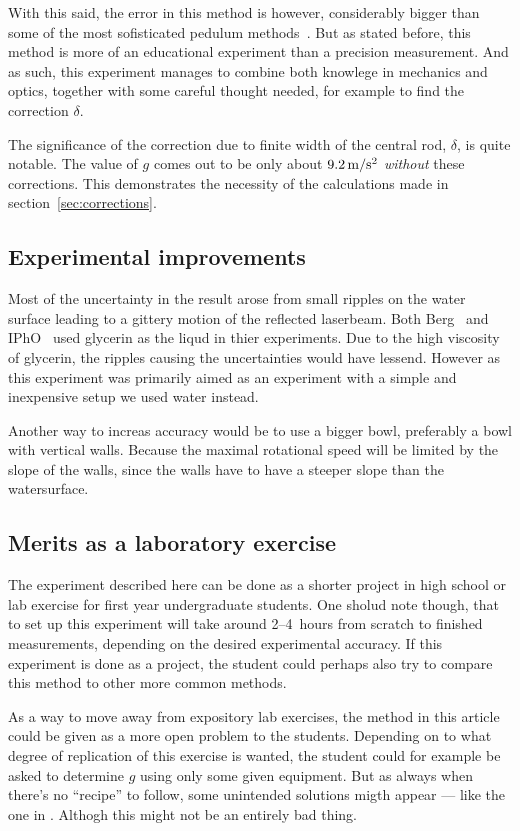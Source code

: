 \documentclass[11pt,towcolumn, swedish, english]{article}
\begin{document}
With this said, the error in this method is however, considerably
bigger than some of the most sofisticated pedulum
methods~\cite{Candela2001}. But as stated before, this
method is more of an educational experiment than a precision
measurement. And as such, this experiment manages to combine both
knowlege in mechanics and optics, together with some careful thought
needed, for example to find the correction $\delta$. 

The significance of the correction due to finite width of the central
rod, $\delta$, is quite notable. The value of $g$ comes out to be only
about $\unit[9.2]{m/s^2}$ \emph{without} these corrections. This
demonstrates the necessity of the calculations made in
section~\ref{sec:corrections}. 


\subsection{Experimental improvements}
Most of the uncertainty in the result arose from small ripples on the
water surface leading to a gittery motion of the reflected
laserbeam. Both Berg~\cite{Berg1990} and IPhO~\cite{IPhO2001} used
glycerin as the liqud in thier experiments. Due to the high viscosity
of glycerin, the ripples causing the uncertainties would have lessend.
However as this experiment was primarily aimed as an experiment with a
simple and inexpensive setup we used water instead.  

Another way to increas accuracy would be to use a bigger bowl,
preferably a bowl with vertical walls. Because the maximal rotational
speed will be limited by the slope of the walls, since the walls have
to have a steeper slope than the watersurface.


\subsection{Merits as a laboratory exercise}
The experiment described here can be done as a shorter project in high
school or lab exercise for first year undergraduate students. One
sholud note though, that to set up this experiment will take around
2--4~hours from scratch to finished measurements, depending on the
desired experimental accuracy. If this experiment is done as a
project, the student could perhaps also try to compare this method to
other more common methods.

As a way to move away from expository lab exercises, the method in
this article could be given as a more open problem to the
students. Depending on to what degree of replication of this exercise
is wanted, the student could for example be asked to determine $g$
using only some given equipment. But as always when there's no
``recipe'' to follow, some unintended solutions migth appear --- like
the one in \cite{IPhO2001}. Althogh this might not be an entirely bad
thing. 
\end{document}
